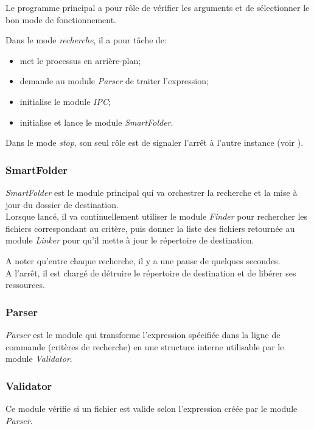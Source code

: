 \documentclass[11pt, a4paper]{article}
\begin{document}
Le programme principal a pour rôle de vérifier les arguments et de sélectionner le bon mode de fonctionnement.

Dans le mode \textit{recherche}, il a pour tâche de:
\begin{itemize}
    \item met le processus en arrière-plan;
    \item demande au module \textit{Parser} de traiter l'expression;
    \item initialise le module \textit{IPC};
    \item initialise et lance le module \textit{SmartFolder}.\\
\end{itemize}

Dans le mode \textit{stop}, son seul rôle est de signaler l'arrêt à l'autre instance (voir ).

\subsubsection{SmartFolder}
\textit{SmartFolder} est le module principal qui va orchestrer la recherche et la mise à jour du dossier de destination. \\

Lorsque lancé, il va continuellement utiliser le module \textit{Finder} pour rechercher les fichiers correspondant au critère,
puis donner la liste des fichiers retournée au module \textit{Linker} pour qu'il mette à jour le répertoire de destination.

A noter qu'entre chaque recherche, il y a une pause de quelques secondes. \\

A l'arrêt, il est chargé de détruire le répertoire de destination et de libérer ses ressources.

\subsubsection{Parser}
\textit{Parser} est le module qui transforme 
l'expression spécifiée dans la ligne de commande (critères de recherche) en une structure interne utilisable par le module \textit{Validator}.

\subsubsection{Validator}
Ce module vérifie si un fichier est valide selon l'expression créée par le module \textit{Parser}.
\end{document}
